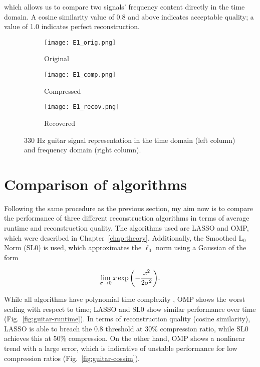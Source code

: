 \noindent which allows us to compare two signals' frequency content directly in the time domain. A cosine similarity value of 0.8 and above indicates acceptable quality; a value of 1.0 indicates perfect reconstruction.

\begin{figure}[htb]
	\centering
	\begin{subfigure}{\textwidth}
		\centering
		\texttt{[image: E1\_orig.png]}
		\caption{Original}
		\label{fig:guitar-original}
	\end{subfigure}
	\begin{subfigure}{\textwidth}
		\centering
		\texttt{[image: E1\_comp.png]}
		\caption{Compressed}
		\label{fig:guitar-compressed}
	\end{subfigure}
	\begin{subfigure}{\textwidth}
		\centering
		\texttt{[image: E1\_recov.png]}
		\caption{Recovered}
		\label{fig:guitar-recovered}
	\end{subfigure}
	\caption{330 Hz guitar signal representation in the time domain (left column) and frequency domain (right column).}
	\label{fig:guitar}
\end{figure}


\section{Comparison of algorithms}
\label{sec:audio-algorithms}
Following the same procedure as the previous section, my aim now is to compare the performance of three different reconstruction algorithms in terms of average runtime and reconstruction quality. The algorithms used are LASSO and OMP, which were described in Chapter~\ref{chap:theory}. Additionally, the Smoothed L$_0$ Norm (SL0) \cite{Mohimani2009} is used, which approximates the $\ell_0$ norm using a Gaussian of the form

\begin{equation}
	\label{eq:sl0}
	\lim_{\sigma \rightarrow 0} x \exp\qty(-\frac{x^2}{2\sigma^2}).
\end{equation}

While all algorithms have polynomial time complexity \cite{Efron2004,Sturm2012,Xiang2019}, OMP shows the worst scaling with respect to time; LASSO and SL0 show similar performance over time (Fig.~\ref{fig:guitar-runtime}). In terms of reconstruction quality (cosine similarity), LASSO is able to breach the 0.8 threshold at 30\% compression ratio, while SL0 achieves this at 50\% compression. On the other hand, OMP shows a nonlinear trend with a large error, which is indicative of unstable performance for low compression ratios (Fig.~\ref{fig:guitar-cossim}).

